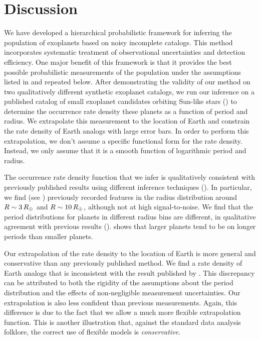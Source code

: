 \section{Discussion}

We have developed a hierarchical probabilistic framework for inferring the
population of exoplanets based on noisy incomplete catalogs.
This method incorporates systematic treatment of observational uncertainties
and detection efficiency.
One major benefit of this framework is that it provides the best possible
probabilistic measurements of the population under the assumptions listed in
 and repeated below.
After demonstrating the validity of our method on two qualitatively different
synthetic exoplanet catalogs, we run our inference on a published catalog of
small exoplanet candidates orbiting Sun-like stars (\citealt{Petigura:2013}) to
determine the occurrence rate density these planets as a function of period
and radius.
We extrapolate this measurement to the location of Earth and constrain the
rate density of Earth analogs with large error bars.
In order to perform this extrapolation, we don't assume a specific functional
form for the rate density.
Instead, we only assume that it is a smooth function of logarithmic period and
radius.

The occurrence rate density function that we infer is qualitatively consistent
with previously published results using different inference techniques
(\citealt{Dong:2013, Fressin:2013, Petigura:2013}).
In particular, we find (see ) previously recorded features in the
radius distribution around $R\sim 3\,R_\oplus$ and $R\sim
10\,R_\oplus$, although not at high signal-to-noise.
We find that the period distributions for planets in different radius bins are
different, in qualitative agreement with previous results (\citealt{Dong:2013}).
 shows that larger planets tend to be on longer periods than
smaller planets.


Our extrapolation of the rate density to the location of Earth is more general
and conservative than any previously published method.
We find a rate density of Earth analogs that is inconsistent with the result
published by \citet{Petigura:2013}.
This discrepancy can be attributed to both the rigidity of the assumptions
about the period distribution and the effects of non-negligible measurement
uncertainties.
Our extrapolation is also less confident than previous measurements.
Again, this difference is due to the fact that we allow a much more flexible
extrapolation function.
This is another illustration that, against the standard data analysis
folklore, the correct use of flexible models is \emph{conservative}.

